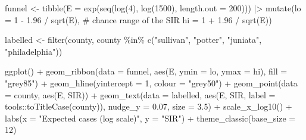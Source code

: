 \documentclass[
  letterpaper,
  DIV=11,
  numbers=noendperiod]{scrartcl}
\newenvironment{Shaded}{\begin{snugshade}}{\end{snugshade}}
\newcommand{\AttributeTok}[1]{\textcolor[rgb]{0.40,0.45,0.13}{#1}}
\newcommand{\CommentTok}[1]{\textcolor[rgb]{0.37,0.37,0.37}{#1}}
\newcommand{\DecValTok}[1]{\textcolor[rgb]{0.68,0.00,0.00}{#1}}
\newcommand{\FloatTok}[1]{\textcolor[rgb]{0.68,0.00,0.00}{#1}}
\newcommand{\FunctionTok}[1]{\textcolor[rgb]{0.28,0.35,0.67}{#1}}
\newcommand{\NormalTok}[1]{\textcolor[rgb]{0.00,0.23,0.31}{#1}}
\newcommand{\OtherTok}[1]{\textcolor[rgb]{0.00,0.23,0.31}{#1}}
\newcommand{\SpecialCharTok}[1]{\textcolor[rgb]{0.37,0.37,0.37}{#1}}
\newcommand{\StringTok}[1]{\textcolor[rgb]{0.13,0.47,0.30}{#1}}
\begin{document}
\begin{Shaded}
\begin{Highlighting}[]
\NormalTok{funnel }\OtherTok{\textless{}{-}} \FunctionTok{tibble}\NormalTok{(}\AttributeTok{E =} \FunctionTok{exp}\NormalTok{(}\FunctionTok{seq}\NormalTok{(}\FunctionTok{log}\NormalTok{(}\DecValTok{4}\NormalTok{), }\FunctionTok{log}\NormalTok{(}\DecValTok{1500}\NormalTok{), }\AttributeTok{length.out =} \DecValTok{200}\NormalTok{))) }\SpecialCharTok{|\textgreater{}}
  \FunctionTok{mutate}\NormalTok{(}\AttributeTok{lo =} \DecValTok{1} \SpecialCharTok{{-}} \FloatTok{1.96} \SpecialCharTok{/} \FunctionTok{sqrt}\NormalTok{(E),                   }\CommentTok{\# chance range of the SIR}
         \AttributeTok{hi =} \DecValTok{1} \SpecialCharTok{+} \FloatTok{1.96} \SpecialCharTok{/} \FunctionTok{sqrt}\NormalTok{(E))}

\NormalTok{labelled }\OtherTok{\textless{}{-}} \FunctionTok{filter}\NormalTok{(county, county }\SpecialCharTok{\%in\%} \FunctionTok{c}\NormalTok{(}\StringTok{"sullivan"}\NormalTok{, }\StringTok{"potter"}\NormalTok{, }\StringTok{"juniata"}\NormalTok{, }\StringTok{"philadelphia"}\NormalTok{))}

\FunctionTok{ggplot}\NormalTok{() }\SpecialCharTok{+}
  \FunctionTok{geom\_ribbon}\NormalTok{(}\AttributeTok{data =}\NormalTok{ funnel, }\FunctionTok{aes}\NormalTok{(E, }\AttributeTok{ymin =}\NormalTok{ lo, }\AttributeTok{ymax =}\NormalTok{ hi), }\AttributeTok{fill =} \StringTok{"grey85"}\NormalTok{) }\SpecialCharTok{+}
  \FunctionTok{geom\_hline}\NormalTok{(}\AttributeTok{yintercept =} \DecValTok{1}\NormalTok{, }\AttributeTok{colour =} \StringTok{"grey50"}\NormalTok{) }\SpecialCharTok{+}
  \FunctionTok{geom\_point}\NormalTok{(}\AttributeTok{data =}\NormalTok{ county, }\FunctionTok{aes}\NormalTok{(E, SIR)) }\SpecialCharTok{+}
  \FunctionTok{geom\_text}\NormalTok{(}\AttributeTok{data =}\NormalTok{ labelled, }\FunctionTok{aes}\NormalTok{(E, SIR, }\AttributeTok{label =}\NormalTok{ tools}\SpecialCharTok{::}\FunctionTok{toTitleCase}\NormalTok{(county)),}
            \AttributeTok{nudge\_y =} \FloatTok{0.07}\NormalTok{, }\AttributeTok{size =} \FloatTok{3.5}\NormalTok{) }\SpecialCharTok{+}
  \FunctionTok{scale\_x\_log10}\NormalTok{() }\SpecialCharTok{+}
  \FunctionTok{labs}\NormalTok{(}\AttributeTok{x =} \StringTok{"Expected cases (log scale)"}\NormalTok{, }\AttributeTok{y =} \StringTok{"SIR"}\NormalTok{) }\SpecialCharTok{+}
  \FunctionTok{theme\_classic}\NormalTok{(}\AttributeTok{base\_size =} \DecValTok{12}\NormalTok{)}
\end{Highlighting}
\end{Shaded}
\end{document}
